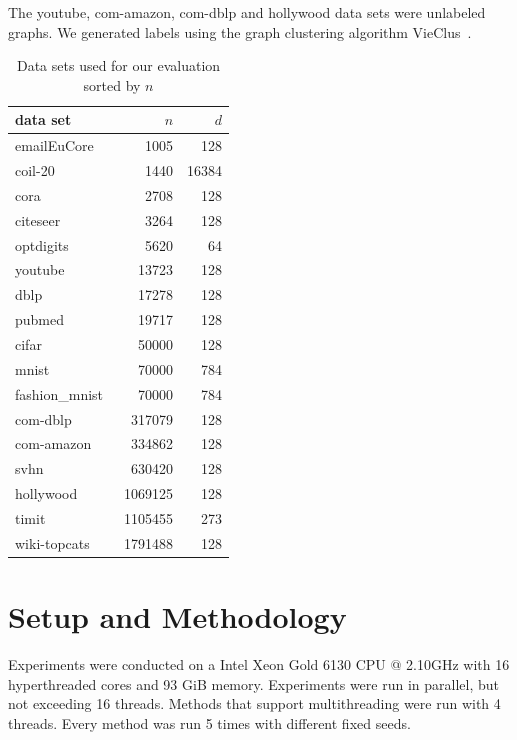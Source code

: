 The youtube, com-amazon, com-dblp and hollywood data sets were unlabeled graphs.
We generated labels using the graph clustering algorithm VieClus~\cite{vieclus}.

\begin{table}[tb]
  \centering
  \begin{tabular}{lrr}
    \toprule
    data set & $n$ & $d$ \\ \midrule
    emailEuCore~\cite{snapnets} & \num{1005} & \num{128} \\
    coil-20~\cite{coil} & \num{1440} & \num{16384} \\
    cora~\cite{nr} & \num{2708} & \num{128} \\
    citeseer~\cite{nr} & \num{3264} & \num{128} \\
    optdigits~\cite{uci} & \num{5620} & \num{64} \\
    youtube~\cite{socialcomputingasu} & \num{13723} & \num{128} \\
    dblp~\cite{gempe} & \num{17278} & \num{128} \\
    pubmed~\cite{nr} & \num{19717} & \num{128} \\
    cifar~\cite{tinyimages} & \num{50000} & \num{128} \\
    mnist~\cite{lecun-mnist} & \num{70000} & \num{784} \\
    fashion\_mnist~\cite{famnist} & \num{70000} & \num{784} \\
    com-dblp~\cite{snapnets} & \num{317079} & \num{128} \\
    com-amazon~\cite{snapnets} & \num{334862} & \num{128} \\
    svhn~\cite{svhn} & \num{630420} & \num{128} \\
    hollywood~\cite{nr} & \num{1069125} & \num{128} \\
    timit~\cite{timit}\footnotemark & \num{1105455} & \num{273} \\
    wiki-topcats~\cite{snapnets} & \num{1791488} & \num{128} \\
    \bottomrule
  \end{tabular}
  \caption{Data sets used for our evaluation sorted by $n$}
  \label{tab:datasets}
\end{table}

\section{Setup and Methodology}

Experiments were conducted on a Intel Xeon Gold 6130 CPU @ 2.10GHz with 16
hyperthreaded cores and 93 GiB memory. Experiments were run in parallel, but
not exceeding 16 threads. Methods that support multithreading were run with 4
threads. Every method was run 5 times with different fixed seeds.

